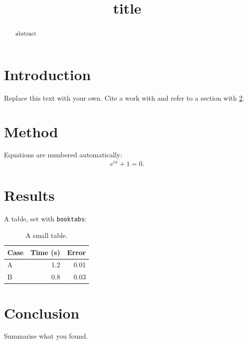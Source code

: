 \documentclass[sigconf,nonacm]{acmart}
\title{{{title}}}
{{authors}}
\begin{document}
\begin{abstract}
{{abstract}}
\end{abstract}
\maketitle

\section{Introduction}
Replace this text with your own. Cite a work with \cite{knuth1984} and refer to a
section with \ref{sec:method}.

\section{Method}\label{sec:method}
Equations are numbered automatically:
\begin{equation}
  e^{i\pi} + 1 = 0.
\end{equation}

\section{Results}
A table, set with \texttt{booktabs}:
\begin{table}[h]
  \centering
  \begin{tabular}{lrr}
    \toprule
    Case & Time (s) & Error \\
    \midrule
    A & 1.2 & 0.01 \\
    B & 0.8 & 0.03 \\
    \bottomrule
  \end{tabular}
  \caption{A small table.}
  \label{tab:results}
\end{table}

\section{Conclusion}
Summarise what you found.



\end{document}
